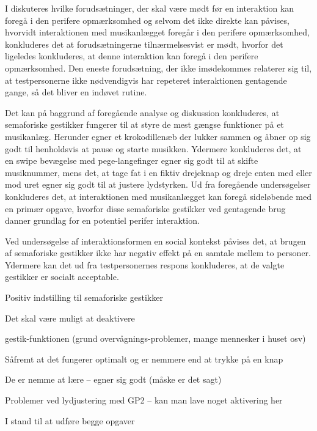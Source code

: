 I  diskuteres hvilke forudsætninger, der skal være mødt før en interaktion kan foregå i den perifere opmærksomhed og selvom det ikke direkte kan påvises, hvorvidt interaktionen med musikanlægget foregår i den perifere opmærksomhed, konkluderes det at forudsætningerne tilnærmelsesvist er mødt, hvorfor det ligeledes konkluderes, at denne interaktion kan foregå i den perifere opmærksomhed. Den eneste forudsætning, der ikke imødekommes relaterer sig til, at testpersonerne ikke nødvendigvis har repeteret interaktionen gentagende gange, så det bliver en indøvet rutine.\blankline
%  


















Det kan på baggrund af foregående analyse og diskussion konkluderes, at semaforiske gestikker fungerer til at styre de mest gængse funktioner på et musikanlæg. Herunder egner et krokodillenæb der lukker sammen og åbner op sig godt til henholdsvis at pause og starte musikken. Ydermere konkluderes det, at en swipe bevægelse med pege-langefinger egner sig godt til at skifte musiknummer, mens det, at tage fat i en fiktiv drejeknap og dreje enten med eller mod uret egner sig godt til at justere lydstyrken. Ud fra foregående undersøgelser konkluderes det, at interaktionen med musikanlægget kan foregå sideløbende med en primær opgave, hvorfor disse semaforiske gestikker ved gentagende brug danner grundlag for en potentiel perifer interaktion. 

Ved undersøgelse af interaktionsformen en social kontekst påvises det, at brugen af semaforiske gestikker ikke har negativ effekt på en samtale mellem to personer. Ydermere kan det ud fra testpersonernes respons konkluderes, at de valgte gestikker er socialt acceptable. 

Positiv indstilling til semaforiske gestikker

Det skal være muligt at deaktivere 

gestik-funktionen (grund overvågnings-problemer, mange mennesker i huset osv) 

Såfremt at det fungerer optimalt og er nemmere end at trykke på en knap

De er nemme at lære – egner sig godt (måske er det sagt)

Problemer ved lydjustering med GP2 – kan man lave noget aktivering her 

I stand til at udføre begge opgaver



